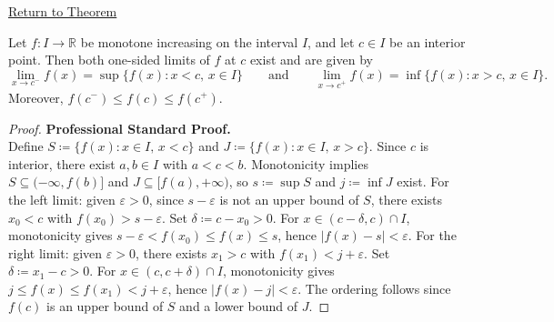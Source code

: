 \newpage
{}
\label{prf:monotone-one-sided-limits}

\begin{remark*}[Return]
\hyperref[thm:monotone-one-sided-limits]{Return to Theorem}
\end{remark*}

\begin{theorem*}
Let $f : I \to \mathbb{R}$ be monotone increasing on the interval $I$, and let $c \in I$ be an interior point. Then both one-sided limits of $f$ at $c$ exist and are given by
\[
  \lim_{x \to c^{-}} f(x) = \sup\{f(x) : x < c,\, x \in I\}
  \qquad \text{and} \qquad
  \lim_{x \to c^{+}} f(x) = \inf\{f(x) : x > c,\, x \in I\}.
\]
Moreover, $f(c^{-}) \leq f(c) \leq f(c^{+})$.
\end{theorem*}

\begin{proof}
\textbf{Professional Standard Proof.}~\\
Define $S \coloneqq \{f(x) : x \in I,\, x < c\}$ and $J \coloneqq \{f(x) : x \in I,\, x > c\}$. Since $c$ is interior, there exist $a, b \in I$ with $a < c < b$. Monotonicity implies $S \subseteq (-\infty, f(b)]$ and $J \subseteq [f(a), +\infty)$, so $s \coloneqq \sup S$ and $j \coloneqq \inf J$ exist. For the left limit: given $\varepsilon > 0$, since $s - \varepsilon$ is not an upper bound of $S$, there exists $x_0 < c$ with $f(x_0) > s - \varepsilon$. Set $\delta \coloneqq c - x_0 > 0$. For $x \in (c - \delta, c) \cap I$, monotonicity gives $s - \varepsilon < f(x_0) \leq f(x) \leq s$, hence $|f(x) - s| < \varepsilon$. For the right limit: given $\varepsilon > 0$, there exists $x_1 > c$ with $f(x_1) < j + \varepsilon$. Set $\delta \coloneqq x_1 - c > 0$. For $x \in (c, c + \delta) \cap I$, monotonicity gives $j \leq f(x) \leq f(x_1) < j + \varepsilon$, hence $|f(x) - j| < \varepsilon$. The ordering follows since $f(c)$ is an upper bound of $S$ and a lower bound of $J$.
\end{proof}

